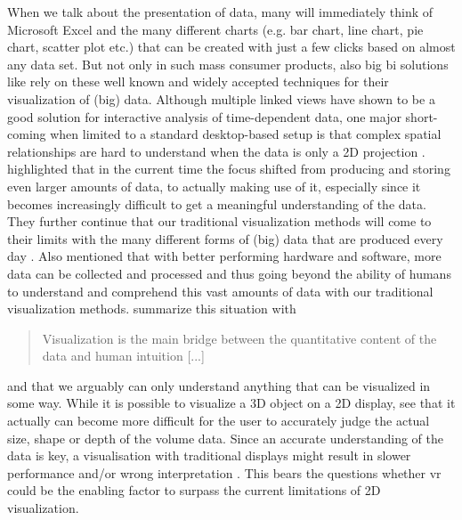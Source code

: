 When we talk about the presentation of data, many will immediately think of Microsoft Excel and the many different charts (e.g. bar chart, line chart, pie chart, scatter plot etc.) that can be created with just a few clicks based on almost any data set. But not only in such mass consumer products, also big \gls{bi} solutions like \cite{TableauSoftware2016} rely on these well known and widely accepted techniques for their visualization of (big) data. Although multiple linked views have shown to be a good solution for interactive analysis of time-dependent data, one major short-coming when limited to a standard desktop-based setup is that complex spatial relationships are hard to understand when the data is only a 2D projection \citep{Hentschel2009}. \newline
\cite{Jamieson2007} highlighted that in the current time the focus shifted from producing and storing even larger amounts of data, to actually making use of it, especially since it becomes increasingly difficult to get a meaningful understanding of the data. They further continue that our traditional visualization methods will come to their limits with the many different forms of (big) data that are produced every day \citep{Jamieson2007}. Also \cite{Sarathy2000} mentioned that with better performing hardware and software, more data can be collected and processed and thus going beyond the ability of humans to understand and comprehend this vast amounts of data with our traditional visualization methods. \citet[p.609]{Donalek2014} summarize this situation with \blockquote{Visualization is the main bridge between the quantitative content of the data and human intuition [...]} and that we arguably can only understand anything that can be visualized in some way. While it is possible to visualize a 3D object on a 2D display, \cite{Laha2012} see that it actually can become more difficult for the user to accurately judge the actual size, shape or depth of the volume data. Since an accurate understanding of the data is key, a visualisation with traditional displays might result in slower performance and/or wrong interpretation \citep{Laha2012}. This bears the questions whether \gls{vr} could be the enabling factor to surpass the current limitations of 2D visualization.\newline
